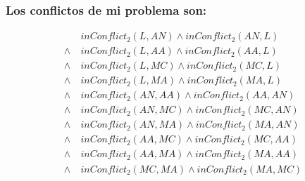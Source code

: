 \documentclass[a4paper,11pt]{article}
\begin{document}
\subsubsection{Los conflictos de mi problema son:}
\[
    \begin{aligned}
                & inConflict_2(L, AN) \land inConflict_2(AN, L)   \\
        \land\  & inConflict_2(L, AA) \land inConflict_2(AA, L)   \\
        \land\  & inConflict_2(L, MC) \land inConflict_2(MC, L)   \\
        \land\  & inConflict_2(L, MA) \land inConflict_2(MA, L)   \\
        \land\  & inConflict_2(AN, AA) \land inConflict_2(AA, AN) \\
        \land\  & inConflict_2(AN, MC) \land inConflict_2(MC, AN) \\
        \land\  & inConflict_2(AN, MA) \land inConflict_2(MA, AN) \\
        \land\  & inConflict_2(AA, MC) \land inConflict_2(MC, AA) \\
        \land\  & inConflict_2(AA, MA) \land inConflict_2(MA, AA) \\
        \land\  & inConflict_2(MC, MA) \land inConflict_2(MA, MC)
    \end{aligned}
\]

\newpage
\end{document}
